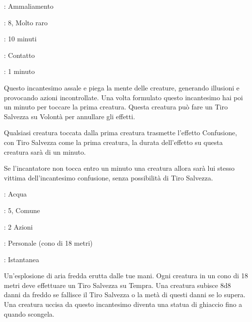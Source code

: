 \begin{multicols}{2}
\noindent\colorbox{OBSSgold!10}{
\begin{minipage}{0.95\linewidth}
\begin{description}[noitemsep, topsep=0pt, parsep=0pt, partopsep=0pt, leftmargin=0cm, labelwidth=1.3cm]
	\item[\textbf{Lista}]: Ammaliamento
	\item[\textbf{Livello}]: 8, Molto raro
	\item[\textbf{Lancio}]: 10 minuti
	\item[\textbf{Gittata}]: Contatto
	\item[\textbf{Durata}]: 1 minuto
\end{description}
\end{minipage}}\smallskip

Questo incantesimo assale e piega la mente delle creature, generando illusioni e provocando azioni incontrollate. Una volta formulato questo incantesimo hai poi un minuto per toccare la prima creatura. Questa creatura può fare un Tiro Salvezza su Volontà per annullare gli effetti.

Qualsiasi creatura toccata dalla prima creatura trasmette l'effetto Confusione, con Tiro Salvezza come la prima creatura, la durata dell'effetto su questa creatura sarà di un minuto.

Se l'incantatore non tocca entro un minuto una creatura allora sarà lui stesso vittima dell'incantesimo confusione, senza possibilità di Tiro Salvezza.

\noindent\colorbox{OBSSgold!10}{
\begin{minipage}{0.95\linewidth}
\begin{description}[noitemsep, topsep=0pt, parsep=0pt, partopsep=0pt, leftmargin=0cm, labelwidth=1.3cm]
	\item[\textbf{Lista}]: Acqua
	\item[\textbf{Livello}]: 5, Comune
	\item[\textbf{Lancio}]: 2 Azioni
	\item[\textbf{Gittata}]: Personale (cono di 18 metri)
	\item[\textbf{Durata}]: Istantanea
\end{description}
\end{minipage}}\smallskip

Un'esplosione di aria fredda erutta dalle tue mani. Ogni creatura in un cono di 18 metri deve effettuare un Tiro Salvezza su Tempra. Una creatura subisce 8d8 danni da freddo se fallisce il Tiro Salvezza o la metà di questi danni se lo supera. Una creatura uccisa da questo incantesimo diventa una statua di ghiaccio fino a quando scongela.


\end{multicols}
